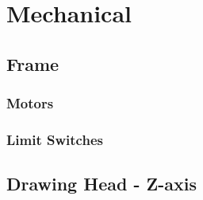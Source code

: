 \section{Mechanical}

	\subsection{Frame}
	
		\subsubsection{Motors}
	
		\subsubsection{Limit Switches}
	
	\subsection{Drawing Head - Z-axis}
	
	
